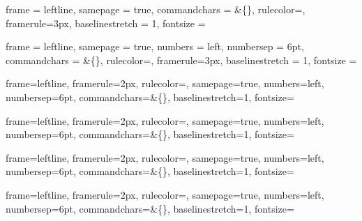 \usepackage[tikz]{bclogo}
\usetikzlibrary{matrix}
\usetikzlibrary{arrows,automata,shapes,calc,positioning,fit}
\usetikzlibrary{backgrounds,shadows,trees}


\usetikzlibrary{calc}
\usepackage{attachfile}



{
  frame            = leftline,
  samepage         = true,
  commandchars     = &\{\}, 
  rulecolor=\color{black!50!white}, framerule=3px,
  baselinestretch  = 1,
  fontsize         = \small
}

{
  frame            = leftline,
  samepage         = true,
  numbers          = left,
  numbersep        = 6pt,
  commandchars     = &\{\}, 
  rulecolor=\color{red!90!black}, framerule=3px,
  baselinestretch  = 1,
  fontsize         = \small
}

{
  frame=leftline,  framerule=2px,  rulecolor=\color{blue},
  samepage=true, numbers=left,   numbersep=6pt,
  commandchars=&\{\}, baselinestretch=1, fontsize=\small
}

{
  frame=leftline,  framerule=2px,  rulecolor=\color{blue},
  samepage=true, numbers=left,   numbersep=6pt,
  commandchars=&\{\}, baselinestretch=1, fontsize=\small
}

{
  frame=leftline,  framerule=2px,  rulecolor=\color{blue},
  samepage=true, numbers=left,   numbersep=6pt,
  commandchars=&\{\}, baselinestretch=1, fontsize=\small
}

{
  frame=leftline,  framerule=2px,  rulecolor=\color{blue},
  samepage=true, numbers=left,   numbersep=6pt,
  commandchars=&\{\}, baselinestretch=1, fontsize=\small
}


\newcommand{\code}[1]{\en \textsl{#1}}{\el}
\newcommand{\ojoinaux}{\setbox0=\hbox{$\bowtie$}%
  \rule[-.02ex]{.25em}{.4pt}\llap{\rule[\ht0]{.25em}{.4pt}}}
\newcommand{\ojoin}{\mathbin{\ojoinaux\mkern-5.6mu\bowtie\mkern-5.7mu\ojoinaux}}
\newcommand{\lojoin}{\mathbin{\ojoinaux\mkern-5.6mu\bowtie}}
\newcommand{\rojoin}{\mathbin{\bowtie\mkern-5.7mu\ojoinaux}}

\newcommand{\stirlingtwo}[2]{\genfrac{\lbrace}{\rbrace}{0pt}{}{#1}{#2}}


